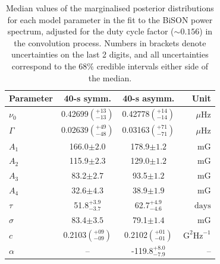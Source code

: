 \begin{table}[ht!]
	\begin{center}
		\caption{Median values of the marginalised posterior distributions for each model parameter in the fit to the BiSON power spectrum, adjusted for the duty cycle factor ($\sim 0.156$) in the convolution process. Numbers in brackets denote uncertainties on the last 2 digits, and all uncertainties correspond to the $68 \%$ credible intervals either side of the median.}
		\label{tab:PSD_fit_params}
		\begin{tabular}{l c c r}
			\hline
			{\bf Parameter} & {\bf 40-s symm.} & {\bf 40-s asymm.} & {\bf Unit} \\
			\hline
			
			{$\nu_0$} & {0.42699$\left(_{-13}^{+13}\right)$} & {0.42778$\left(_{-14}^{+14}\right)$} & {$\mu\mathrm{Hz} $}\\
			
			{$\Gamma$} & {0.02639$\left(_{-48}^{+49}\right)$} & {0.03163$\left(_{-71}^{+71}\right)$} & {$\mu\mathrm{Hz} $} \\
			
			{$A_1$} & {166.0$\pm 2.0$} & {178.9$\pm 1.2$} & {$\mathrm{mG}$} \\
			
			{$A_2$} & {115.9$\pm 2.3$} & {129.0$\pm 1.2$} & {$\mathrm{mG}$} \\
			
			{$A_3$} & {83.2$\pm 2.7$} & {93.5$\pm 1.2$} & {$\mathrm{mG}$} \\
			
			{$A_4$} & {32.6$\pm 4.3$} & {38.9$\pm 1.9$} &  {$\mathrm{mG}$} \\	
			
			{$\tau$} & {51.8$_{-3.7}^{+3.9}$} & {62.7$_{-4.6}^{+4.9}$} & {$\mathrm{days}$} \\	
			
			{$\sigma$} & {83.4$\pm 3.5$} & {79.1$\pm 1.4$} &  {$\mathrm{mG}$} \\	
			
			{$c$} & {0.2103$\left(_{-09}^{+09}\right)$} & {0.2102$\left(_{-01}^{+01}\right)$}  & {$\mathrm{G}^2\mathrm{Hz}^{-1}$} \\	
			
			{$\alpha$} & {--} & {-119.8$_{-7.9}^{+8.0}$} & {--} \\	
			\hline
		\end{tabular}
	\end{center}
\end{table}


